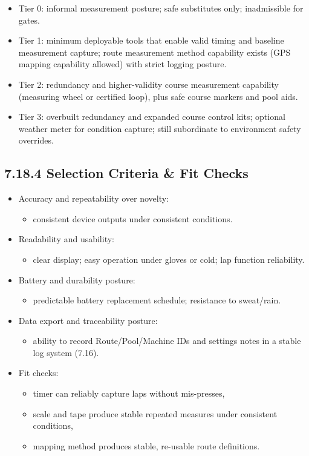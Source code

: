 \documentclass[10pt]{article}
\begin{document}
\begin{itemize}
\item Tier 0: informal measurement posture; safe substitutes only; inadmissible for gates.
\item Tier 1: minimum deployable tools that enable valid timing and baseline measurement capture; route measurement method capability exists (GPS mapping capability allowed) with strict logging posture.
\item Tier 2: redundancy and higher-validity course measurement capability (measuring wheel or certified loop), plus safe course markers and pool aids.
\item Tier 3: overbuilt redundancy and expanded course control kits; optional weather meter for condition capture; still subordinate to environment safety overrides.
\end{itemize}

\subsection*{7.18.4 Selection Criteria \& Fit Checks}
{}

\begin{itemize}
\item Accuracy and repeatability over novelty:
  \begin{itemize}
  \item consistent device outputs under consistent conditions.
  \end{itemize}
\item Readability and usability:
  \begin{itemize}
  \item clear display; easy operation under gloves or cold; lap function reliability.
  \end{itemize}
\item Battery and durability posture:
  \begin{itemize}
  \item predictable battery replacement schedule; resistance to sweat/rain.
  \end{itemize}
\item Data export and traceability posture:
  \begin{itemize}
  \item ability to record Route/Pool/Machine IDs and settings notes in a stable log system (7.16).
  \end{itemize}
\item Fit checks:
  \begin{itemize}
  \item timer can reliably capture laps without mis-presses,
  \item scale and tape produce stable repeated measures under consistent conditions,
  \item mapping method produces stable, re-usable route definitions.
  \end{itemize}
\end{itemize}
\end{document}
